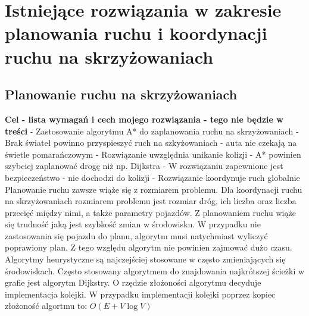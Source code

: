 \chapter{Istniejące rozwiązania w zakresie planowania ruchu i koordynacji ruchu na skrzyżowaniach} \label{chap:state-of-the-art}

\section{Planowanie ruchu na skrzyżowaniach}

\textbf{Cel - lista wymagań i cech mojego rozwiązania - tego nie będzie w treści}
\newline
- Zastosowanie algorytmu A* do zaplanowania ruchu na skrzyżowaniach
\newline
- Brak świateł powinno przyspieszyć ruch na szkyżowaniach - auta nie czekają na świetle pomarańczowym
\newline
- Rozwiązanie uwzględnia unikanie kolizji
\newline
- A* powinien szybciej zaplanować drogę niż np. Dijkstra
\newline
- W rozwiązaniu zapewnione jest bezpieczeństwo - nie dochodzi do kolizji
\newline
- Rozwiązanie koordynuje ruch globalnie
\newline
\newline
\newline
\newline
\indent
  Planowanie ruchu zawsze wiąże się z rozmiarem problemu. Dla koordynacji ruchu na skrzyżowaniach rozmiarem problemu jest rozmiar dróg, ich liczba oraz liczba przecięć między nimi, a także parametry pojazdów. Z planowaniem ruchu wiąże się trudność jaką jest szybkość zmian w środowisku. W przypadku nie zastosowania się pojazdu do planu, algorytm musi natychmiast wyliczyć poprawiony plan. Z tego względu algorytm nie powinien zajmować dużo czasu. Algorytmy heurystyczne są najczejściej stosowane w często zmieniających się środowiskach.
\newline
\indent
  Często stosowany algorytmem do znajdowania najkrótszej ścieżki w grafie jest algorytm Dijkstry. O rzędzie złożoności algorytmu decyduje implementacja kolejki. W przypadku implementacji kolejki poprzez kopiec złożoność algortmu to:
\newline
\newline
\begin{math}
O(E + V\log V)
\end{math}
\newline
